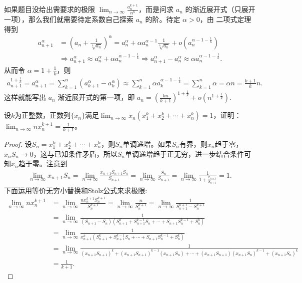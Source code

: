 \documentclass[../../main.tex]{subfiles}%
\begin{document}
\begin{remark}
如果题目没给出需要求的极限 \(\lim_{n\rightarrow \infty} \frac{a_{n}^{k + 1}}{n^k}\)，而是问求 \(a_n\) 的渐近展开式（只展开一项），那么我们就需要待定系数自己探索 \(a_n\) 的阶。待定 \(\alpha>0\)，由 二项式定理得到
\begin{align*}
a_{n+1}^{\alpha}&=\left( a_n+\frac{1}{\sqrt[k]{a_n}} \right) ^{\alpha}=a_{n}^{\alpha}+\alpha a_{n}^{\alpha -1}\frac{1}{\sqrt[k]{a_n}}+o\left( a_{n}^{\alpha -1-\frac{1}{k}} \right)\\
&\Rightarrow a_{n+1}^{\alpha}\approx a_{n}^{\alpha}+\alpha a_{n}^{\alpha -1-\frac{1}{k}}\Rightarrow a_{n+1}^{\alpha}-a_{n}^{\alpha}\approx \alpha a_{n}^{\alpha -1-\frac{1}{k}}.
\end{align*}
从而令 \(\alpha = 1+\frac{1}{k}\)，则
\begin{align*}
a_{n+1}^{1+\frac{1}{k}}=a_{n+1}^{\alpha}=\sum_{k=1}^n{\left( a_{k+1}^{\alpha}-a_{k}^{\alpha} \right)}\approx \sum_{k=1}^n{\alpha a_{k}^{\alpha -1-\frac{1}{k}}}=\sum_{k=1}^n{\alpha}=\alpha n=\frac{k+1}{k}n.
\end{align*}
这样就能写出 \(a_n\) 渐近展开式的第一项，即 \(a_n=\left( \frac{kn}{k+1} \right) ^{1+\frac{1}{k}}+o\left( n^{1+\frac{1}{k}} \right) \).
\end{remark}

\begin{example}
设\(k\)为正整数，正数列\(\{x_n\}\)满足\(\lim_{n\rightarrow\infty}x_n(x_1^k + x_2^k+\cdots+x_n^k)=1\)，证明：\(\lim_{n\rightarrow\infty}nx_n^{k + 1}=\frac{1}{k + 1}\)。
\end{example}
\begin{proof}

设\(S_n = x_1^k + x_2^k+\cdots+x_n^k\)，则\(S_n\)单调递增。如果\(S_n\)有界，则\(x_n\)趋于零，\(x_nS_n\rightarrow0\)，这与已知条件矛盾，所以\(S_n\)单调递增趋于正无穷，进一步结合条件可知\(x_n\)趋于零。注意到
\begin{align*}
\lim_{n\rightarrow\infty}x_{n + 1}S_n=\lim_{n\rightarrow\infty}\frac{x_{n + 1}S_{n + 1}S_n}{S_{n + 1}}=\lim_{n\rightarrow\infty}\frac{S_n}{S_{n + 1}}=\lim_{n\rightarrow\infty}\frac{1}{1+\frac{x_{n + 1}}{S_{n + 1}}}=1.
\end{align*}
下面运用等价无穷小替换和Stolz公式来求极限:
\begin{align*}
\lim_{n\rightarrow\infty}nx_n^{k + 1}&=\lim_{n\rightarrow\infty}\frac{nx_n^{k + 1}S_n^{k + 1}}{S_n^{k + 1}}=\lim_{n\rightarrow\infty}\frac{n}{S_n^{k + 1}}=\lim_{n\rightarrow\infty}\frac{1}{S_{n + 1}^{k + 1}-S_n^{k + 1}}\\
&=\lim_{n\rightarrow\infty}\frac{1}{(S_{n + 1}-S_n)(S_{n + 1}^k + S_{n + 1}^{k - 1}S_n+\cdots+S_{n + 1}S_n^{k - 1}+S_n^k)}\\
&=\lim_{n\rightarrow\infty}\frac{1}{x_{n + 1}^{k}(S_{n + 1}^k + S_{n + 1}^{k - 1}S_n+\cdots+S_{n + 1}S_n^{k - 1}+S_n^k)}\\
&=\lim_{n\rightarrow\infty}\frac{1}{(x_{n + 1}S_{n + 1})^k+(x_{n + 1}S_{n + 1})^{k - 1}(x_{n + 1}S_n)+\cdots+(x_{n + 1}S_{n + 1})(x_{n + 1}S_n)^{k - 1}+(x_{n + 1}S_n)^k}\\
&=\frac{1}{k + 1}.
\end{align*}

\end{proof}
\end{document}
